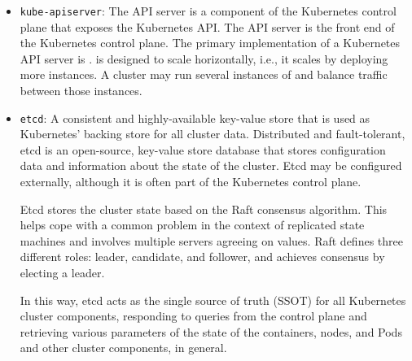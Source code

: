 \begin{itemize}
	\item
	      \texttt{kube-apiserver}: The API server is a component of the
	      Kubernetes control plane that exposes the Kubernetes API. The API
	      server is the front end of the Kubernetes control plane. The primary
	      implementation of a Kubernetes API server is .
	       is designed to scale horizontally, i.e., it scales
	      by deploying more instances. A cluster may run several instances of
	       and balance traffic between those instances.
	\item
	      \texttt{etcd}: A consistent and highly-available key-value store that
	      is used as Kubernetes' backing store for all cluster data. Distributed
	      and fault-tolerant, etcd is an open-source, key-value store database
	      that stores configuration data and information about the state of the
	      cluster. Etcd may be configured externally, although it is often part
	      of the Kubernetes control plane.

	      Etcd stores the cluster state based on the Raft consensus algorithm.
	      This helps cope with a common problem in the context of replicated
	      state machines and involves multiple servers agreeing on values. Raft
	      defines three different roles: leader, candidate, and follower, and
	      achieves consensus by electing a leader.

	      In this way, etcd acts as the single source of truth (SSOT) for all
	      Kubernetes cluster components, responding to queries from the control
	      plane and retrieving various parameters of the state of the
	      containers, nodes, and Pods and other cluster components, in general.



\end{itemize}
